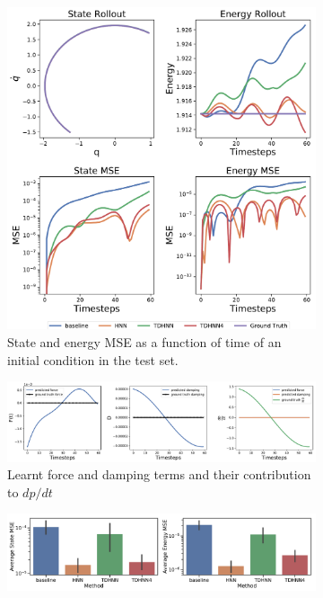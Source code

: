 \documentclass{article}
\begin{document}
\begin{figure}[h!]
\centering
\captionsetup{justification=centering}
	\begin{subfigure}[b]{0.4\textwidth}
		\centering
		\includegraphics[width=\textwidth, trim={0 0 0 12cm},clip]{figures/figures/mass_spring/1/mass_spring_long_0.pdf}
		\caption{State and energy MSE as a function of time of an initial condition in the test set.}
	\end{subfigure}
	\begin{subfigure}[b]{0.48\textwidth}
		\centering
		\includegraphics[width=\textwidth]{figures/figures/mass_spring/1/mass_spring_dpdt_0.pdf}
		\caption{Learnt force and damping terms and their contribution to $dp/dt$}
	\end{subfigure}
	\begin{subfigure}[b]{0.48\textwidth}
	    \centering
		\includegraphics[width=\textwidth]{figures/figures/mass_spring/1/mass_spring_errors_0.pdf}

\end{subfigure}
\end{figure}
\end{document}
